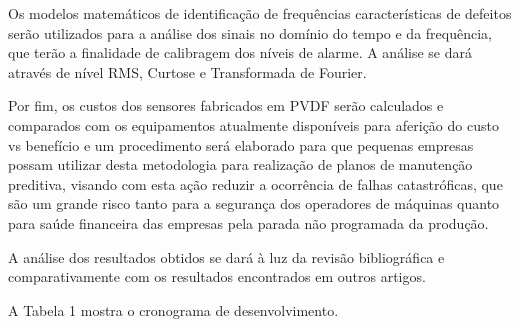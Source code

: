 \documentclass[
	12pt,				
	oneside,			
	a4paper,			
	english,			
	brazil				
	]{abntex2ppgsi}
\begin{document}
Os modelos matemáticos de identificação de frequências características de defeitos serão utilizados para a análise dos sinais no domínio do tempo e da frequência, que terão a finalidade de calibragem dos níveis de alarme. A análise se dará através de nível RMS, Curtose e Transformada de Fourier.  

Por fim, os custos dos sensores fabricados em PVDF serão calculados e comparados com os equipamentos atualmente disponíveis para aferição do custo vs benefício e um procedimento será elaborado para que pequenas empresas possam utilizar desta metodologia para realização de planos de manutenção preditiva, visando com esta ação reduzir a ocorrência de falhas catastróficas, que são um grande risco tanto para a segurança dos operadores de máquinas quanto para saúde financeira das empresas pela parada não programada da produção.

A análise dos resultados obtidos se dará à luz da revisão bibliográfica e comparativamente com os resultados encontrados em outros artigos. 

A Tabela 1 mostra o cronograma de desenvolvimento.
\end{document}

